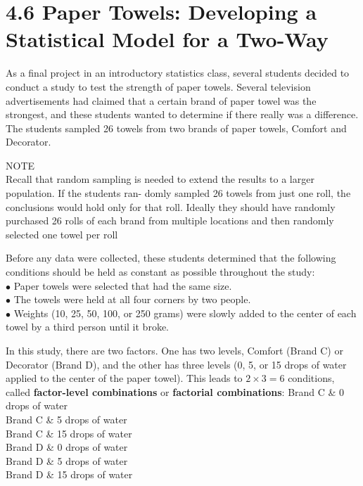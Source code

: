 \documentclass[
]{report}
\theoremstyle{definition}
\theoremstyle{definition}
\theoremstyle{definition}
\theoremstyle{definition}
\theoremstyle{remark}
\begin{document}
\hypertarget{paper-towels-developing-a-statistical-model-for-a-two-way}{%
\chapter{4.6 Paper Towels: Developing a Statistical Model for a Two-Way}\label{paper-towels-developing-a-statistical-model-for-a-two-way}}

As a final project in an introductory statistics class, several students decided to conduct a study to test the
strength of paper towels. Several television advertisements had claimed that a certain brand of paper towel was
the strongest, and these students wanted to determine if there really was a difference. The students sampled
26 towels from two brands of paper towels, Comfort and Decorator.

NOTE\\
Recall that random sampling is needed to extend the results to a larger population. If the students ran-
domly sampled 26 towels from just one roll, the conclusions would hold only for that roll. Ideally they
should have randomly purchased 26 rolls of each brand from multiple locations and then randomly
selected one towel per roll

Before any data were collected, these students determined that the following conditions should be held as
constant as possible throughout the study:\\
\(\bullet\) Paper towels were selected that had the same size.\\
\(\bullet\) The towels were held at all four corners by two people.\\
\(\bullet\) Weights (10, 25, 50, 100, or 250 grams) were slowly added to the center of each towel by a third person until it broke.

In this study, there are two factors. One has two levels, Comfort (Brand C) or Decorator (Brand D), and
the other has three levels (0, 5, or 15 drops of water applied to the center of the paper towel). This leads to
\(2 \times 3 = 6\) conditions, called \textbf{factor-level combinations} or \textbf{factorial combinations}:
Brand C \& 0 drops of water\\
Brand C \& 5 drops of water\\
Brand C \& 15 drops of water\\
Brand D \& 0 drops of water\\
Brand D \& 5 drops of water\\
Brand D \& 15 drops of water
\end{document}
